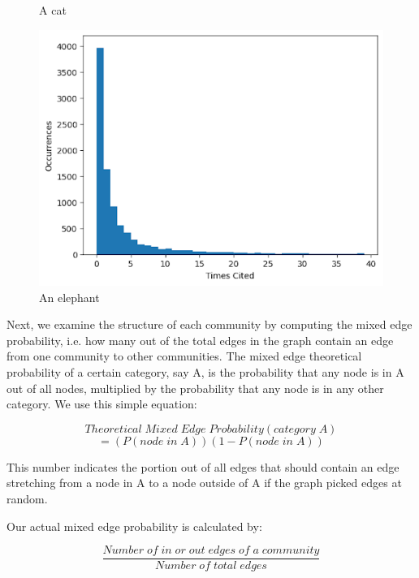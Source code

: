 \documentclass[conference]{IEEEtran}
\begin{document}
\begin{figure}[htbp]
{    \caption{A cat}\label{cat}}
    \parbox[b]{.45\linewidth}{
    \includegraphics[scale=0.23]{times_cited.png}
    \caption{An elephant}\label{elephant}}
\end{figure}

Next, we examine the structure of each community by computing the mixed edge 
probability, i.e. how many out of the total edges in the graph contain an edge 
from one community to other communities. The mixed edge theoretical probability 
of a certain category, say A, is the probability that any node is in A out of 
all nodes, multiplied by the probability that any node is in any other category. 
We use this simple equation: \par

\begin{equation}
    Theoretical\; Mixed\; Edge\; Probability(category\; A)
\end{equation}
\begin{equation}
    = (P(node\; in\;A)) (1 - P(node\;in\;A))\label{eq1}
\end{equation}

This number indicates the portion out of all edges that should contain an edge stretching 
from a node in A to a node outside of A if the graph picked edges at random. \par

Our actual mixed edge probability is calculated by: \par
\begin{equation}
    \dfrac{Number\; of\; in\; or\; out\; edges\; of\; a\; community}{Number\; of\; total\; edges}
    \label{eq2}
\end{equation}
\end{document}
